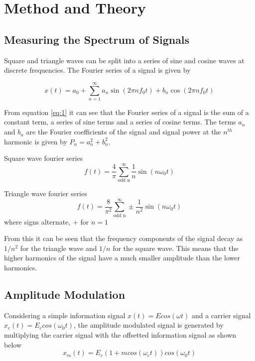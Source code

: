 \documentclass[12pt]{article}
\begin{document}
\section{Method and Theory}

\subsection{Measuring the Spectrum of Signals}

Square and triangle waves can be split into a series of sine and cosine waves at discrete frequencies. The Fourier series of a signal is given by

\begin{equation}
    x(t) = a_0 + \sum_{n=1}^{\infty} a_n \sin(2\pi n f_0 t) + b_n \cos(2\pi n f_0 t)
    \label{eq:1}
\end{equation}

From equation \ref{eq:1} it can see that the Fourier series of a signal is the sum of a constant term, a series of sine terms and a series of cosine terms. 
The terms $a_n$ and $b_n$ are the Fourier coefficients of the signal and signal power at the $n^{th}$ harmonic is given by $P_n = a_n^2 + b_n^2$.

Square wave fourier series
\begin{equation}
    f(t) = \frac{4}{\pi} \sum_{\text{odd n}}^{\infty} \frac{1}{n} \sin\left(n \omega_0 t\right)
    \label{eq:2}
\end{equation}

Triangle wave fourier series
\begin{equation}
    f(t) = \frac{8}{\pi^2} \sum_{\text{odd n}}^{\infty} \pm \frac{1}{n^2} \sin\left(n\omega_0 t\right)
    \label{eq:3}
\end{equation}
where signs alternate, $+$ for $n = 1$

From this it can be seen that the frequency components of the signal decay as $1/n^2$ for the triangle wave and $1/n$ for the square wave. This means that the higher harmonics of the signal have a much smaller amplitude than the lower harmonics.

\subsection{Amplitude Modulation}

Considering a simple information signal $x(t) = E cos(\omega t)$ and a carrier signal $x_c(t) = E_c cos(\omega_0 t)$, the amplitude modulated signal is generated by multiplying the carrier signal with the offsetted information signal as shown below
\begin{equation}
    x_m(t) = E_c(1+m cos(\omega_ct))cos(\omega_0t)
    \label{eq:4}
\end{equation}
\end{document}
